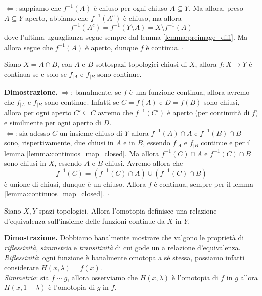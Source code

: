     $\boxed{\Leftarrow}$: sappiamo che $f^{-1}(A)$ è chiuso per ogni chiuso $A \subseteq Y$. Ma allora, preso $A \subseteq Y$ aperto, abbiamo che $f^{-1}(A^c)$ è chiuso, ma allora
    $$
        f^{-1}(A^c) = f^{-1}(Y \setminus A) = X \setminus f^{-1}(A)
    $$
    dove l'ultima uguaglianza segue sempre dal lemma \ref{lemma:preimage_diff}. Ma allora segue che $f^{-1}(A)$ è aperto, dunque $f$ è continua. 
\hfill $\square$
%
\vspace{0.5cm}
\begin{lemma}[\textcolor{blue}{dell'incollamento}]
    Siano $X = A \cap B$, con $A$ e $B$ sottospazi topologici chiusi di $X$, allora $f: X \to Y$ è continua se e solo se $f_{|A}$ e $f_{|B}$ sono continue.
    \label{lemma:gluing_lemma}
\end{lemma}

\noindent \textbf{Dimostrazione. }
    $\boxed{\Rightarrow}$: banalmente, se $f$ è una funzione continua, allora avremo che $f_{|A}$ e $f_{|B}$ sono continue. Infatti se $C = f(A)$ e $D = f(B)$ sono chiusi, allora per ogni aperto $C' \subseteq C$ avremo che
    $f^{-1}(C')$ è aperto (per continuità di $f$) e similmente per ogni aperto di $D$. \\
    $\boxed{\Leftarrow}$:  sia adesso $C$ un insieme chiuso di $Y$ allora $f^{-1}(A) \cap A$ e $f^{-1}(B) \cap B$ sono, rispettivamente, due chiusi in $A$ e in $B$, essendo $f_{|A}$ e $f_{|B}$ continue e per il lemma \ref{lemma:continuos_map_closed}. Ma allora
    $f^{-1}(C) \cap A$ e $f^{-1}(C) \cap B$ sono chiusi in $X$, essendo $A$ e $B$ chiusi. Avremo allora che
    $$
    f^{-1}(C) = (f^{-1}(C) \cap A) \cup (f^{-1}(C) \cap B)
    $$
    è unione di chiusi, dunque è un chiuso. Allora $f$ è continua, sempre per il lemma \ref{lemma:continuos_map_closed}.
\hfill $\square$
%
\begin{prop}
    Siano $X, Y$ spazi topologici. Allora l'omotopia definisce una relazione d'equivalenza sull'insieme delle funzioni continue da $X$ in $Y$.
\end{prop}
%
\noindent \textbf{Dimostrazione. }
    Dobbiamo banalmente mostrare che valgono le proprietà di \emph{riflessività}, \emph{simmetria} e \emph{transitività} di cui gode un a relazione d'equivalenza. \\
    \emph{Riflessività}: ogni funzione è banalmente omotopa a sé stessa, possiamo infatti considerare $H(x, \lambda) = f(x)$. \\
    \emph{Simmetria}: sia $f \sim g$, allora osserviamo che $H(x, \lambda)$ è l'omotopia di $f$ in $g$ allora $H(x, 1-\lambda)$ è l'omotopia di $g$ in $f$. \\
